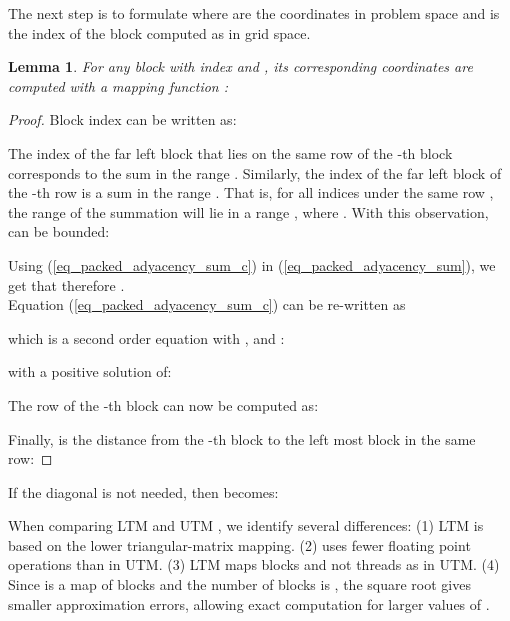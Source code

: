 \documentclass[conference]{IEEEtran}
\newtheorem*{thma}{Lemma}
\begin{document}
The next step is to formulate  where  are the coordinates in problem space and 
 is the index of the block  computed as  in grid space. 
\begin{thma}
	For any block  with index  and , 
	its corresponding  coordinates are computed with a mapping function :
	
\end{thma}
\begin{proof}[Proof]
	Block index  can be written as:
	
	The index of the far left block that lies on the same row of the -th block corresponds to the sum in the range . 
	Similarly, the index of the far left block of the -th row is 
	a sum in the range . That is, for all  indices under the same row , 
	the range of the summation will lie in a range , where . With this observation,  can be bounded:
	 
	Using (\ref{eq_packed_adyacency_sum_c}) in (\ref{eq_packed_adyacency_sum}), we get that  therefore .\\
	Equation (\ref{eq_packed_adyacency_sum_c}) can be re-written as
	
	which is a second order equation with ,  and :
	
	with a positive solution of:
	
	The row of the -th block can now be computed as:
	 
	Finally,  is the distance from the -th block to the left most block in the same row:
	
\end{proof}

If the diagonal is not needed, then  becomes:


When comparing LTM and UTM \cite{AvrilGA12}, we identify several differences: (1) LTM is based on the lower triangular-matrix mapping. (2)  uses fewer floating point operations than in UTM. 
(3) LTM maps blocks and not threads as in UTM. (4) Since  is a map of blocks and the number of blocks is , the square root gives smaller approximation errors, allowing 
exact computation for larger values of . 
\end{document}
